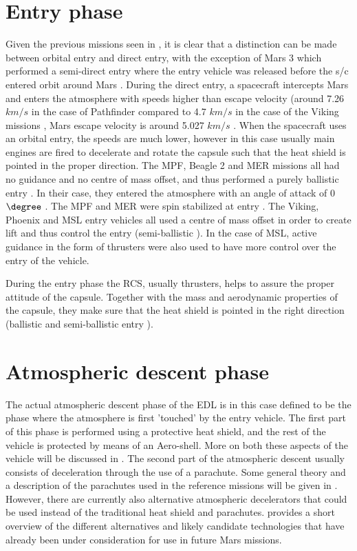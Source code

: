 \section{Entry phase}
\label{sec:entry}
Given the previous missions seen in , it is clear that a distinction can be made between orbital entry and direct entry, with the exception of Mars 3 which performed a semi-direct entry where the entry vehicle was released before the \ac{s/c} entered orbit around Mars \cite{mars3_2014}. During the direct entry, a spacecraft intercepts Mars and enters the atmosphere with speeds higher than escape velocity (around 7.26 $km/s$ in the case of Pathfinder compared to 4.7 $km/s$ in the case of the Viking missions \cite{braun2006}, Mars escape velocity is around 5.027 $km/s$ \cite{williams2015}. When the spacecraft uses an orbital entry, the speeds are much lower, however in this case usually main engines are fired to decelerate and rotate the capsule such that the heat shield is pointed in the proper direction. The \ac{MPF}, Beagle 2 and MER missions all had no guidance and no centre of mass offset, and thus performed a purely ballistic entry \cite{mooij2013entry}. In their case, they entered the atmosphere with an angle of attack of 0$\degree$ \cite{braun2006,smith2002}. The \ac{MPF} and MER were spin stabilized at entry \cite{steltzner2006}. The Viking, Phoenix and \ac{MSL} entry vehicles all used a centre of mass offset in order to create lift and thus control the entry \cite{braun2006} (semi-ballistic \cite{mooij2013entry}). In the case of \ac{MSL}, active guidance in the form of thrusters were also used to have more control over the entry of the vehicle.   


During the entry phase the \ac{RCS}, usually thrusters, helps to assure the proper attitude of the capsule. Together with the mass and aerodynamic properties of the capsule, they make sure that the heat shield is pointed in the right direction (ballistic and semi-ballistic entry \cite{mooij2013entry}). 

\section{Atmospheric descent phase}
\label{sec:descent}
The actual atmospheric descent phase of the \ac{EDL} is in this case defined to be the phase where the atmosphere is first 'touched' by the entry vehicle. The first part of this phase is performed using a protective heat shield, and the rest of the vehicle is protected by means of an Aero-shell. More on both these aspects of the vehicle will be discussed in . The second part of the atmospheric descent usually consists of deceleration through the use of a parachute. Some general theory and a description of the parachutes used in the reference missions will be given in . However, there are currently also alternative atmospheric decelerators that could be used instead of the traditional heat shield and parachutes.  provides a short overview of the different alternatives and likely candidate technologies that have already been under consideration for use in future Mars missions. 


